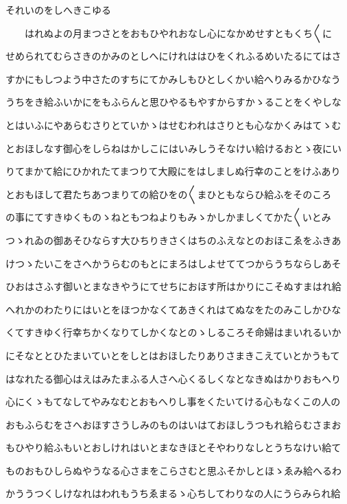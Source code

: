 \documentclass[a4paper,11pt,landscape]{ltjtarticle}
\begin{document}
それいのをしへきこゆる
\par\medskip
　　はれぬよの月まつさとをおもひやれおなし心になかめせすともくち〱に
\par\medskip
せめられてむらさきのかみのとしへにけれははひをくれふるめいたるにてはさ
\par\medskip
すかにもしつよう中さたのすちにてかみしもひとしくかい給へりみるかひなう
\par\medskip
うちをき給ふいかにをもふらんと思ひやるもやすからすかゝることをくやしな
\par\medskip
とはいふにやあらむさりとていかゝはせむわれはさりとも心なかくみはてゝむ
\par\medskip
とおほしなす御心をしらねはかしこにはいみしうそなけい給けるおとゝ夜にい
\par\medskip
りてまかて給にひかれたてまつりて大殿にをはしましぬ行幸のことをけふあり
\par\medskip
とおもほして君たちあつまりての給ひをの〱まひともならひ給ふをそのころ
\par\medskip
の事にてすきゆくものゝねともつねよりもみゝかしかましくてかた〱いとみ
\par\medskip
つゝれゐの御あそひならす大ひちりきさくはちのふえなとのおほこゑをふきあ
\par\medskip
けつゝたいこをさへかうらむのもとにまろはしよせててつからうちならしあそ
\par\medskip
ひおはさふす御いとまなきやうにてせちにおほす所はかりにこそぬすまはれ給
\par\medskip
へれかのわたりにはいとをほつかなくてあきくれはてぬなをたのみこしかひな
\par\medskip
くてすきゆく行幸ちかくなりてしかくなとのゝしるころそ命婦はまいれるいか
\par\medskip
にそなととひたまいていとをしとはおほしたりありさまきこえていとかうもて
\par\medskip
はなれたる御心はえはみたまふる人さへ心くるしくなとなきぬはかりおもへり
\par\medskip
心にくゝもてなしてやみなむとおもへりし事をくたいてける心もなくこの人の
\par\medskip
おもふらむをさへおほすさうしみのものはいはておほしうつもれ給らむさまお
\par\medskip
もひやり給ふもいとおしけれはいとまなきほとそやわりなしとうちなけい給て
\par\medskip
ものおもひしらぬやうなる心さまをこらさむと思ふそかしとほゝゑみ給へるわ
\par\medskip
かううつくしけなれはわれもうちゑまるゝ心ちしてわりなの人にうらみられ給
\end{document}
